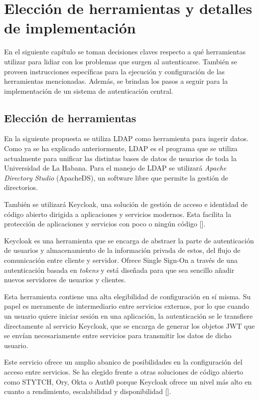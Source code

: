 \chapter{Elección de herramientas y detalles de implementación}\label{chapter:implementation}
En el siguiente capítulo se toman decisiones claves respecto a qué herramientas utilizar para lidiar con los problemas que surgen al autenticarse. También se proveen instrucciones específicas para la ejecución y configuración de las herramientas mencionadas.  Además, se brindan los pasos a seguir para la implementación de un sistema de autenticación central. 

\section{Elección de herramientas} \label{tools-used}
En la siguiente propuesta se utiliza LDAP como herramienta para ingerir datos. Como ya se ha explicado anteriormente, LDAP es el programa que se utiliza actualmente para unificar las distintas bases de datos de usuarios de toda la Universidad de La Habana. Para el manejo de LDAP se utilizará \textit{Apache Directory Studio} (ApacheDS), un software libre que permite la gestión de directorios.

También se utilizará Keycloak, una solución de gestión de acceso e identidad de código abierto dirigida a aplicaciones y servicios modernos. Esta facilita la protección de aplicaciones y servicios con poco o ningún código [\cite{muyon2020metodos}]. 

Keycloak es una herramienta que se encarga de abstraer la parte de autenticación de usuarios y almacenamiento de la información privada de estos, del flujo de comunicación entre cliente y servidor. Ofrece Single Sign-On a través de una autenticación basada en \textit{tokens} y está diseñada para que sea sencillo añadir nuevos servidores de usuarios y clientes.

Esta herramienta contiene una alta elegibilidad de configuración en sí misma. Su papel es meramente de intermediario entre servicios externos, por lo que cuando un usuario quiere iniciar sesión en una aplicación, la autenticación se le transfiere directamente al servicio Keycloak, que se encarga de generar los objetos JWT que se envían necesariamente entre servicios para transmitir los datos de dicho usuario.

Este servicio ofrece un amplio abanico de posibilidades en la configuración del acceso entre servicios. Se ha elegido frente a otras soluciones de código abierto como STYTCH, Ory, Okta o Auth0 porque Keycloak ofrece un nivel más alto en cuanto a rendimiento, escalabilidad y disponibilidad [\cite{lobato2022regulacion}]. 

